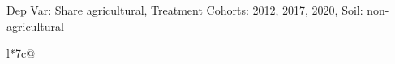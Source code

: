 \begin{table}[H]
\captionlistentry[table]{}
\label{table:beaver_land_class_DVis_land_class_1_SCg123_SSNAG}
\scriptsize %
Dep Var: Share agricultural, Treatment Cohorts: 2012, 2017, 2020, Soil: non-agricultural \\
\begin{threeparttable}
\begin{tabulary}{\textwidth}{l*{7}{c}@{}}
\toprule \toprule
\noalign{\smallskip}
\noalign{\smallskip}
\midrule \bottomrule
\end{tabulary}
\medskip
\end{threeparttable}
\end{table}
